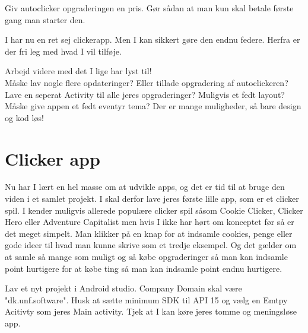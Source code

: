\begin{exercise}
	Giv autoclicker opgraderingen en pris. Gør sådan at man kun skal betale første gang man starter den. 
\end{exercise}
I har nu en ret sej clickerapp. Men I kan sikkert gøre den endnu federe. Herfra er der fri leg med hvad I vil tilføje. 
\begin{exercise}
	Arbejd videre med det I lige har lyst til! \\
	Måske lav nogle flere opdateringer? Eller tillade opgradering af autoclickeren? Lave en seperat Activity til alle jeres opgraderinger?
	Muligvis et fedt layout? Måske give appen et fedt eventyr tema? Der er mange muligheder, så bare design og kod løs!
\end{exercise}\section{Clicker app}
Nu har I lært en hel masse om at udvikle apps, og det er tid til at bruge den viden i et samlet projekt. I skal derfor lave jeres første lille app, som er et clicker spil. I kender muligvis allerede populære clicker spil såsom Cookie Clicker, Clicker Hero eller Adventure Capitalist men hvis I ikke har hørt om konceptet før så er det meget simpelt. Man klikker på en knap for at indsamle cookies, penge eller gode ideer til hvad man kunne skrive som et tredje eksempel. Og det gælder om at samle så mange som muligt og så købe opgraderinger så man kan indsamle point hurtigere for at købe ting så man kan indsamle point endnu hurtigere.

\begin{exercise}
	Lav et nyt projekt i Android studio. Company Domain skal være "dk.unf.software". Husk at sætte minimum SDK til API 15 og vælg en Emtpy Acitivty som jeres Main activity.
	Tjek at I kan køre jeres tomme og meningsløse app.
\end{exercise}

